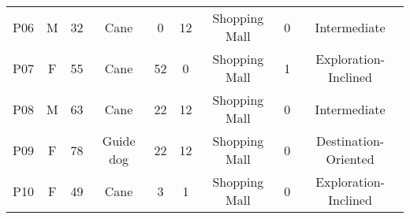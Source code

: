 \begin{table*}[]
{\begin{tabular}{ccccccccc}
P06 & M      & 32  & Cane      & 0                                                        & 12                                                                           & Shopping Mall                                                   & 0                                                                     & Intermediate         \\
P07 & F      & 55  & Cane      & 52                                                       & 0                                                                            & Shopping Mall                                                   & 1                                                                     & Exploration-Inclined \\
P08 & M      & 63  & Cane      & 22                                                       & 12                                                                           & Shopping Mall                                                   & 0                                                                     & Intermediate         \\
P09 & F      & 78  & Guide dog & 22                                                       & 12                                                                           & Shopping Mall                                                   & 0                                                                     & Destination-Oriented \\
P10 & F      & 49  & Cane      & 3                                                        & 1                                                                            & Shopping Mall                                                   & 0                                                                     & Exploration-Inclined \\
\bottomrule
\end{tabular}
}
\end{table*}